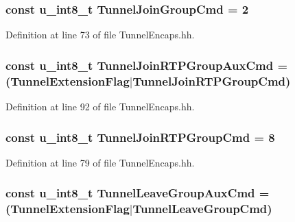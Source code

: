 \subsubsection[{Tunnel\+Join\+Group\+Cmd}]{\setlength{\rightskip}{0pt plus 5cm}const u\+\_\+int8\+\_\+t Tunnel\+Join\+Group\+Cmd = 2}\label{TunnelEncaps_8hh_a1818ff1f8a0fdda68288eb6929af523a}


Definition at line 73 of file Tunnel\+Encaps.\+hh.

\subsubsection[{Tunnel\+Join\+R\+T\+P\+Group\+Aux\+Cmd}]{\setlength{\rightskip}{0pt plus 5cm}const u\+\_\+int8\+\_\+t Tunnel\+Join\+R\+T\+P\+Group\+Aux\+Cmd = ({\bf Tunnel\+Extension\+Flag}$\vert${\bf Tunnel\+Join\+R\+T\+P\+Group\+Cmd})}\label{TunnelEncaps_8hh_ac21d9fbe74b2845525fa3bc9a969c65b}


Definition at line 92 of file Tunnel\+Encaps.\+hh.

\subsubsection[{Tunnel\+Join\+R\+T\+P\+Group\+Cmd}]{\setlength{\rightskip}{0pt plus 5cm}const u\+\_\+int8\+\_\+t Tunnel\+Join\+R\+T\+P\+Group\+Cmd = 8}\label{TunnelEncaps_8hh_a7393dc4ce5c803bb2c9e63b50bd9a0d1}


Definition at line 79 of file Tunnel\+Encaps.\+hh.

\subsubsection[{Tunnel\+Leave\+Group\+Aux\+Cmd}]{\setlength{\rightskip}{0pt plus 5cm}const u\+\_\+int8\+\_\+t Tunnel\+Leave\+Group\+Aux\+Cmd = ({\bf Tunnel\+Extension\+Flag}$\vert${\bf Tunnel\+Leave\+Group\+Cmd})}\label{TunnelEncaps_8hh_a87d6876b5622d5212d88366139428775}


